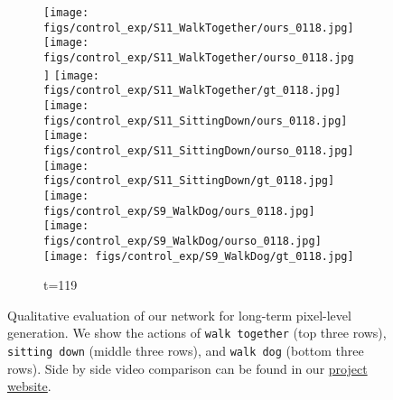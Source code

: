 \documentclass{article}
\begin{document}
\begin{appendix}
\begin{figure*}[!thbp]
	\begin{subfigure}{0.12\linewidth}
        \caption*{t=119}
        \vspace{-7pt}
	    \texttt{[image: figs/control\_exp/S11\_WalkTogether/ours\_0118.jpg]}
	    \texttt{[image: figs/control\_exp/S11\_WalkTogether/ourso\_0118.jpg]}
	    \vspace{.2cm}
  		\texttt{[image: figs/control\_exp/S11\_WalkTogether/gt\_0118.jpg]}
  		\texttt{[image: figs/control\_exp/S11\_SittingDown/ours\_0118.jpg]}
  		\texttt{[image: figs/control\_exp/S11\_SittingDown/ourso\_0118.jpg]}
  		\vspace{.2cm}
  		\texttt{[image: figs/control\_exp/S11\_SittingDown/gt\_0118.jpg]}
  		\texttt{[image: figs/control\_exp/S9\_WalkDog/ours\_0118.jpg]}
  		\texttt{[image: figs/control\_exp/S9\_WalkDog/ourso\_0118.jpg]}
  		\vspace{.2cm}
  		\texttt{[image: figs/control\_exp/S9\_WalkDog/gt\_0118.jpg]}
	\end{subfigure}
    \vspace{-10pt}
    \caption{Qualitative evaluation of our network for long-term pixel-level generation.  We show the actions of \texttt{walk together} (top three rows), \texttt{sitting down} (middle three rows), and \texttt{walk dog} (bottom three rows). Side by side video comparison can be found in our \href{https://goo.gl/U7UOfy}{project website}.}
\label{fig:h36mgtft2}
\vspace{-40pt}
\end{figure*}


\end{appendix}
\end{document}
